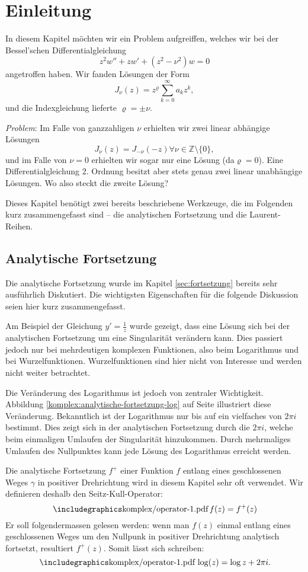 \section{Einleitung}

In diesem Kapitel möchten wir ein Problem aufgreiffen, welches wir bei der Bessel'schen Differentialgleichung
$$ z^2w''+zw'+(z^2 - \nu^2)w=0$$
angetroffen haben. Wir fanden Lösungen der Form 
$$J_\nu(z)=z^\varrho\sum_{k=0}^{\infty}a_kz^k,$$
und die Indexgleichung lieferte $\varrho=\pm\nu.$

\emph{Problem}: Im Falle von ganzzahligen $\nu$ erhielten wir zwei linear abhängige Lösungen $$J_\nu(z) = J_{-\nu}(-z)\forall\nu\in\mathbb{Z}\setminus\{0\},$$
und im Falle von $\nu=0$ erhielten wir sogar nur eine Lösung (da$\varrho=0$). Eine Differentialgleichung 2. Ordnung besitzt aber stets genau zwei linear unabhängige Lösungen. Wo also steckt die zweite Lösung?

Dieses Kapitel benötigt zwei bereits beschriebene Werkzeuge, die im Folgenden kurz zusammengefasst sind -- die analytischen Fortsetzung und die Laurent-Reihen.

\subsection{Analytische Fortsetzung}
Die analytische Fortsetzung wurde im Kapitel \ref{sec:fortsetzung} bereits sehr ausführlich Diskutiert. Die wichtigsten Eigenschaften für die folgende Diskussion seien hier kurz zusammengefasst.

Am Beispiel der Gleichung $y'=\frac{1}{z}$ wurde gezeigt, dass eine Lösung sich bei der analytischen Fortsetzung um eine Singularität verändern kann. Dies passiert jedoch nur bei mehrdeutigen komplexen Funktionen, also beim Logarithmus und bei Wurzelfunktionen. Wurzelfunktionen sind hier nicht von Interesse und werden nicht weiter betrachtet. 

Die Veränderung des Logarithmus ist jedoch von zentraler Wichtigkeit. Abbildung \ref{komplex:analytische-fortsetzung-log} auf Seite \pageref{komplex:analytische-fortsetzung-log} illustriert diese Veränderung. Bekanntlich ist der Logarithmus nur bis auf ein vielfaches von $2\pi i$ bestimmt. Dies zeigt sich in der analytischen Fortsetzung durch die $2\pi i$, welche beim einmaligen Umlaufen der Singularität hinzukommen. Durch mehrmaliges Umlaufen des Nullpunktes kann jede Lösung des Logarithmus erreicht werden.

Die analytische Fortsetzung $f^+$ einer Funktion $f$ entlang eines geschlossenen Weges $\gamma$ in positiver Drehrichtung wird in diesem Kapitel sehr oft verwendet. Wir definieren deshalb den Seitz-Kull-Operator:
$$\sk f(z)= f^+(z)$$
Er soll folgendermassen gelesen werden: wenn man $f(z)$ einmal entlang eines geschlossenen Weges um den Nullpunk in positiver Drehrichtung analytisch fortsetzt, resultiert $f^+(z)$. 
Somit lässt sich schreiben: 
$$\sk \log(z) = \log z + 2\pi i.$$

